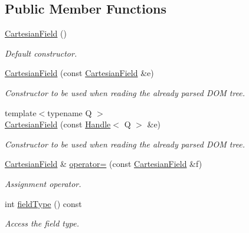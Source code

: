 \subsection*{Public Member Functions}
\begin{DoxyCompactItemize}
\item 
\hyperlink{class_d_d4hep_1_1_geometry_1_1_cartesian_field_a65e67bc0e5d3481af8fefc0f1402aaaa}{CartesianField} ()
\begin{DoxyCompactList}\small\item\em Default constructor. \item\end{DoxyCompactList}\item 
\hyperlink{class_d_d4hep_1_1_geometry_1_1_cartesian_field_a9c038e6dc1accccbb1ba92cf0ac82d17}{CartesianField} (const \hyperlink{class_d_d4hep_1_1_geometry_1_1_cartesian_field}{CartesianField} \&e)
\begin{DoxyCompactList}\small\item\em Constructor to be used when reading the already parsed DOM tree. \item\end{DoxyCompactList}\item 
{\footnotesize template$<$typename Q $>$ }\\\hyperlink{class_d_d4hep_1_1_geometry_1_1_cartesian_field_a9feb07987ef78617905c04b29d1f8668}{CartesianField} (const \hyperlink{class_d_d4hep_1_1_handle}{Handle}$<$ Q $>$ \&e)
\begin{DoxyCompactList}\small\item\em Constructor to be used when reading the already parsed DOM tree. \item\end{DoxyCompactList}\item 
\hyperlink{class_d_d4hep_1_1_geometry_1_1_cartesian_field}{CartesianField} \& \hyperlink{class_d_d4hep_1_1_geometry_1_1_cartesian_field_a2f848b1b5eb1cf751e58c7d2076dd915}{operator=} (const \hyperlink{class_d_d4hep_1_1_geometry_1_1_cartesian_field}{CartesianField} \&f)
\begin{DoxyCompactList}\small\item\em Assignment operator. \item\end{DoxyCompactList}\item 
int \hyperlink{class_d_d4hep_1_1_geometry_1_1_cartesian_field_a75f08636b6349cfd0ec276d09187af2f}{fieldType} () const 
\begin{DoxyCompactList}\small\item\em Access the field type. \item\end{DoxyCompactList}\item 

\end{DoxyCompactItemize}
